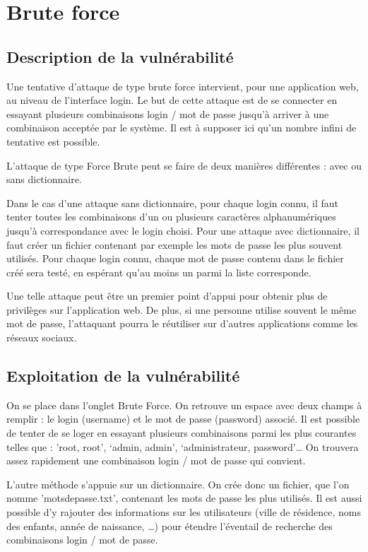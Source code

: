 \newpage

\section{Brute force}

\subsection{Description de la vulnérabilité}

Une tentative d'attaque de type brute force intervient, pour une application web, au niveau de l'interface login. Le but de cette attaque est de se connecter en essayant plusieurs combinaisons login / mot de passe jusqu'à arriver à une combinaison acceptée par le système. Il est à supposer ici qu'un nombre infini de tentative est possible.

L'attaque de type Force Brute peut se faire de deux manières différentes : avec ou sans dictionnaire. 

Dans le cas d'une attaque sans dictionnaire, pour chaque login connu, il faut tenter toutes les combinaisons d'un ou plusieurs caractères alphanumériques jusqu'à correspondance avec le login choisi.
Pour une attaque avec dictionnaire, il faut créer un fichier contenant par exemple les mots de passe les plus souvent utilisés. Pour chaque login connu, chaque mot de passe contenu dans le fichier créé sera testé, en espérant qu'au moins un parmi la liste corresponde.

Une telle attaque peut être un premier point d'appui pour obtenir plus de privilèges sur l'application web. De plus, si une personne utilise souvent le même mot de passe, l'attaquant pourra le réutiliser sur d'autres applications comme les réseaux sociaux.


\subsection{Exploitation de la vulnérabilité}

On se place dans l'onglet Brute Force. On retrouve un espace avec deux champs à remplir : le login (username) et le mot de passe (password) associé. Il est possible de tenter de se loger en essayant plusieurs combinaisons parmi les plus courantes telles que : 'root, root', `admin, admin', `administrateur, password'… On trouvera assez rapidement une combinaison login / mot de passe qui convient.

L'autre méthode s'appuie sur un dictionnaire. On crée donc un fichier, que l'on nomme 'motsdepasse.txt', contenant les mots de passe les plus utilisés. Il est aussi possible d'y rajouter des informations sur les utilisateurs (ville de résidence, noms des enfants, année de naissance, …) pour étendre l'éventail de recherche des combinaisons login / mot de passe.

